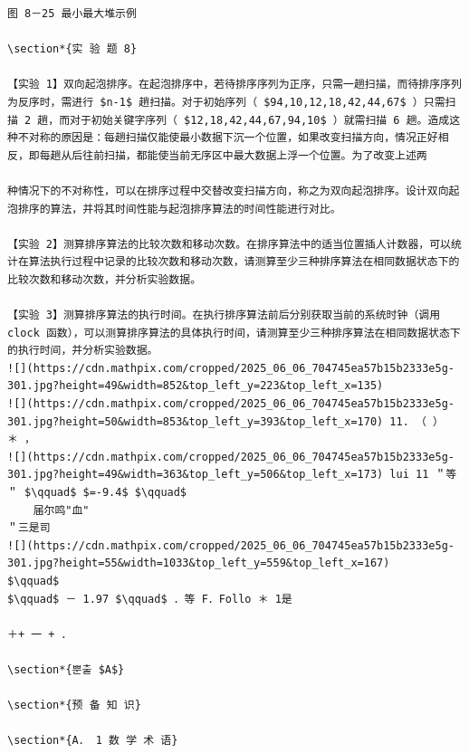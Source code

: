 \documentclass[10pt]{article}
\begin{document}
\begin{verbatim}
图 8－25 最小最大堆示例

\section*{实 验 题 8}

【实验 1】双向起泡排序。在起泡排序中，若待排序序列为正序，只需一趟扫描，而待排序序列为反序时，需进行 $n-1$ 趟扫描。对于初始序列（ $94,10,12,18,42,44,67$ ）只需扫描 2 趟，而对于初始关键字序列（ $12,18,42,44,67,94,10$ ）就需扫描 6 趟。造成这种不对称的原因是：每趟扫描仅能使最小数据下沉一个位置，如果改变扫描方向，情况正好相反，即每趟从后往前扫描，都能使当前无序区中最大数据上浮一个位置。为了改变上述两

种情况下的不对称性，可以在排序过程中交替改变扫描方向，称之为双向起泡排序。设计双向起泡排序的算法，并将其时间性能与起泡排序算法的时间性能进行对比。

【实验 2】测算排序算法的比较次数和移动次数。在排序算法中的适当位置插人计数器，可以统计在算法执行过程中记录的比较次数和移动次数，请测算至少三种排序算法在相同数据状态下的比较次数和移动次数，并分析实验数据。

【实验 3】测算排序算法的执行时间。在执行排序算法前后分别获取当前的系统时钟（调用 clock 函数），可以测算排序算法的具体执行时间，请测算至少三种排序算法在相同数据状态下的执行时间，并分析实验数据。
![](https://cdn.mathpix.com/cropped/2025_06_06_704745ea57b15b2333e5g-301.jpg?height=49&width=852&top_left_y=223&top_left_x=135)
![](https://cdn.mathpix.com/cropped/2025_06_06_704745ea57b15b2333e5g-301.jpg?height=50&width=853&top_left_y=393&top_left_x=170) 11. （ ）
＊ ，
![](https://cdn.mathpix.com/cropped/2025_06_06_704745ea57b15b2333e5g-301.jpg?height=49&width=363&top_left_y=506&top_left_x=173) lui 11 ＂等＂ $\qquad$ $=-9.4$ $\qquad$
    届尔鸣"血"
＂三是司
![](https://cdn.mathpix.com/cropped/2025_06_06_704745ea57b15b2333e5g-301.jpg?height=55&width=1033&top_left_y=559&top_left_x=167)
$\qquad$
$\qquad$ － 1.97 $\qquad$ ．等 F．Follo ＊ 1是

＋+ 一 + ．

\section*{뿐출 $A$}

\section*{预 备 知 识}

\section*{A． 1 数 学 术 语}


\end{verbatim}
\end{document}
